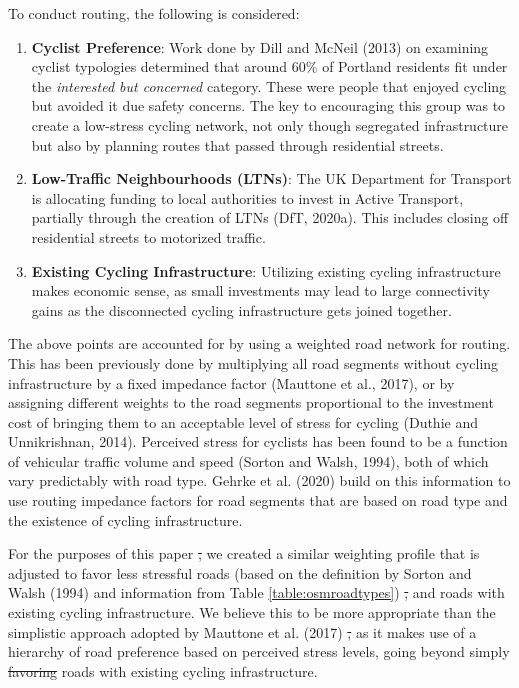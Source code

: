 \documentclass[
]{article}
\providecommand{\tightlist}{%
  \setlength{\itemsep}{0pt}\setlength{\parskip}{0pt}}
\providecommand{\DIFaddtex}[1]{{\protect\color{blue}\uwave{#1}}} %
\providecommand{\DIFdeltex}[1]{{\protect\color{red}\sout{#1}}}                      %
\providecommand{\DIFaddbegin}{} %
\providecommand{\DIFaddend}{} %
\providecommand{\DIFdelbegin}{} %
\providecommand{\DIFdelend}{} %
\providecommand{\DIFadd}[1]{\texorpdfstring{\DIFaddtex{#1}}{#1}} %
\providecommand{\DIFdel}[1]{\texorpdfstring{\DIFdeltex{#1}}{}} %
\newcommand{\DIFscaledelfig}{0.5}
\newlength{\DIFdelgraphicswidth} %
\newlength{\DIFdelgraphicsheight} %
\newcommand{\DIFaddincludegraphics}[2][]{{\color{blue}\fbox{\DIFOincludegraphics[#1]{#2}}}} %
\newcommand{\DIFdelincludegraphics}[2][]{%
\sbox{\DIFdelgraphicsbox}{\DIFOincludegraphics[#1]{#2}}%
\settoboxwidth{\DIFdelgraphicswidth}{\DIFdelgraphicsbox} %
\settoboxtotalheight{\DIFdelgraphicsheight}{\DIFdelgraphicsbox} %
\scalebox{\DIFscaledelfig}{%
\parbox[b]{\DIFdelgraphicswidth}{\usebox{\DIFdelgraphicsbox}\\[-\baselineskip] \rule{\DIFdelgraphicswidth}{0em}}\llap{\resizebox{\DIFdelgraphicswidth}{\DIFdelgraphicsheight}{%
\setlength{\unitlength}{\DIFdelgraphicswidth}%
\begin{picture}(1,1)%
\thicklines\linethickness{2pt} %
{\color[rgb]{1,0,0}\put(0,0){\framebox(1,1){}}}%
{\color[rgb]{1,0,0}\put(0,0){\line( 1,1){1}}}%
{\color[rgb]{1,0,0}\put(0,1){\line(1,-1){1}}}%
\end{picture}%
}\hspace*{3pt}}} %
} %
\DeclareRobustCommand{\DIFaddbegin}{\DIFOaddbegin \let\includegraphics\DIFaddincludegraphics} %
\DeclareRobustCommand{\DIFaddend}{\DIFOaddend \let\includegraphics\DIFOincludegraphics} %
\DeclareRobustCommand{\DIFdelbegin}{\DIFOdelbegin \let\includegraphics\DIFdelincludegraphics} %
\DeclareRobustCommand{\DIFdelend}{\DIFOaddend \let\includegraphics\DIFOincludegraphics} %
\begin{document}
To conduct routing, the following is considered:

\begin{enumerate}
\def\labelenumi{\arabic{enumi}.}
\tightlist
\item
  \textbf{Cyclist Preference}: Work done by Dill and McNeil (2013) on examining
  cyclist typologies determined that around 60\% of Portland residents
  fit under the \emph{interested but concerned} category. These were people
  that enjoyed cycling but avoided it due safety concerns. The key to
  encouraging this group was to create a low-stress cycling network,
  not only though segregated infrastructure but also by planning
  routes that passed through residential streets.
\item
  \textbf{Low-Traffic Neighbourhoods (LTNs)}: The UK Department for Transport is
  allocating funding to local authorities to invest in Active
  Transport, partially through the creation of LTNs
  (DfT, 2020a). This includes closing off residential
  streets to motorized traffic.
\item
  \textbf{Existing Cycling Infrastructure}: Utilizing existing cycling
  infrastructure makes economic sense, as small investments may lead
  to large connectivity gains as the disconnected cycling
  infrastructure gets joined together.
\end{enumerate}

The above points are accounted for by using a weighted road network for
routing. This has been previously done by multiplying all road segments
without cycling infrastructure by a fixed impedance factor
(Mauttone et al., 2017), or by assigning different weights to the road
segments proportional to the investment cost of bringing them to an
acceptable level of stress for cycling (Duthie and Unnikrishnan, 2014).
Perceived stress for cyclists has been found to be a function of vehicular traffic
volume and speed (Sorton and Walsh, 1994), both of which vary predictably
with road type. Gehrke et al. (2020) build on this information to use
routing impedance factors for road segments that are based on road type
and the existence of cycling infrastructure.

For the purposes of this paper \DIFdelbegin \DIFdel{, }\DIFdelend we created a similar weighting profile
that is adjusted to favor less stressful roads (based on the definition
by Sorton and Walsh (1994) and information from Table
\ref{table:osmroadtypes}) \DIFdelbegin \DIFdel{, }\DIFdelend and roads with existing cycling
infrastructure. We believe this to be more appropriate than the simplistic
approach adopted by Mauttone et al. (2017) \DIFdelbegin \DIFdel{, }\DIFdelend as it makes use of a hierarchy
of road preference based on perceived stress levels, going beyond simply
\DIFdelbegin \DIFdel{favoring }\DIFdelend \DIFaddbegin \DIFadd{favouring }\DIFaddend roads with existing cycling infrastructure.
\end{document}
